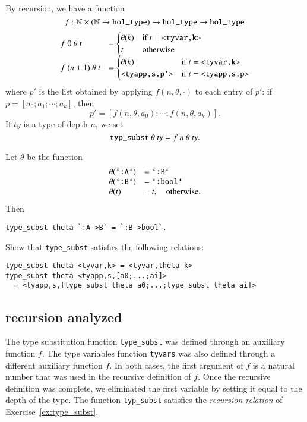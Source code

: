 By recursion, we have a function 
$$f:\ring{N}\times (\ring{N}\to \verb!hol_type!)\to \verb!hol_type! \to \verb!hol_type!$$
$$
\begin{array}{lll}
f~0~\theta~t &=\begin{cases} \theta(k) &\hbox{if } t = \verb!<tyvar,k>!\\ t &\hbox{otherwise}\end{cases}\\
f~(n+1)~\theta~t &=\begin{cases} \theta(k) &\hbox{if } t = \verb!<tyvar,k>!\\ \verb!<tyapp,s,p'>! &\hbox{if } t = \verb!<tyapp,s,p>!\end{cases}\\
\end{array}
$$
where $p'$ is the list obtained by applying $f(n,\theta,\cdot)$ to each entry of $p'$:
if $p=[a_0;a_1;\cdots;a_k]$, then
$$
p' = [f(n,\theta,a_0);\cdots;f(n,\theta,a_k)].
$$
If $ty$ is a type of depth $n$, we set
\begin{equation}
\verb!typ_subst!~\theta~ty = f~n~\theta~ty.
\end{equation}

\begin{example}
Let $\theta$ be the function
$$
\begin{array}{lll}
\theta(\verb!`:A`!) &=\verb!`:B`!\\
\theta(\verb!`:B`!) &=\verb!`:bool`!\\
\theta(t) &= t,\quad\hbox{otherwise}.
\end{array}
$$
Then
\begin{verbatim}
type_subst theta `:A->B` = `:B->bool`.
\end{verbatim}
\end{example}

\begin{exer}\label{ex:type_subst}
Show that \verb!type_subst! satisfies the following relations:
\begin{verbatim}
type_subst theta <tyvar,k> = <tyvar,theta k>
type_subst theta <tyapp,s,[a0;...;ai]> 
  = <tyapp,s,[type_subst theta a0;...;type_subst theta ai]>
\end{verbatim}
\end{exer}

\subsection{recursion analyzed}

The type substitution function \verb!type_subst! was defined through an auxiliary function $f$.  The type variables function \verb!tyvars! was also defined through a different auxiliary function $f$.  In both cases, the first
argument of $f$ is a natural number that was used in the recursive definition of $f$.  Once the recursive definition was complete, we eliminated the first variable by setting it equal to the depth of the type.  The function \verb!typ_subst! satisfies the {\it recursion relation} of Exercise~\ref{ex:type_subst}.

